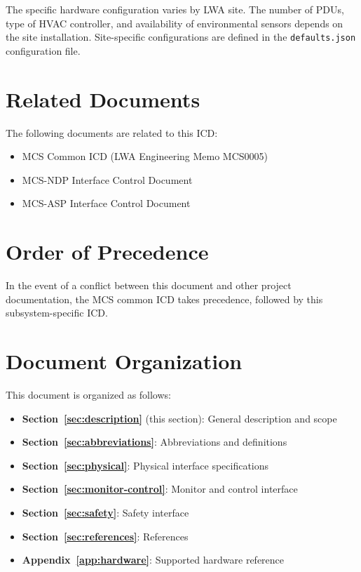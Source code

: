 \begin{siteNote}
The specific hardware configuration varies by LWA site. The number of PDUs, type of HVAC controller, and availability of environmental sensors depends on the site installation. Site-specific configurations are defined in the \texttt{defaults.json} configuration file.
\end{siteNote}

\section{Related Documents}

The following documents are related to this ICD:

\begin{itemize}
    \item MCS Common ICD (LWA Engineering Memo MCS0005)
    \item MCS-NDP Interface Control Document
    \item MCS-ASP Interface Control Document
\end{itemize}

\section{Order of Precedence}

In the event of a conflict between this document and other project documentation, the MCS common ICD takes precedence, followed by this subsystem-specific ICD.

\section{Document Organization}

This document is organized as follows:
\begin{itemize}
    \item \textbf{Section~\ref{sec:description}} (this section): General description and scope
    \item \textbf{Section~\ref{sec:abbreviations}}: Abbreviations and definitions
    \item \textbf{Section~\ref{sec:physical}}: Physical interface specifications
    \item \textbf{Section~\ref{sec:monitor-control}}: Monitor and control interface
    \item \textbf{Section~\ref{sec:safety}}: Safety interface
    \item \textbf{Section~\ref{sec:references}}: References
    \item \textbf{Appendix~\ref{app:hardware}}: Supported hardware reference
\end{itemize}
